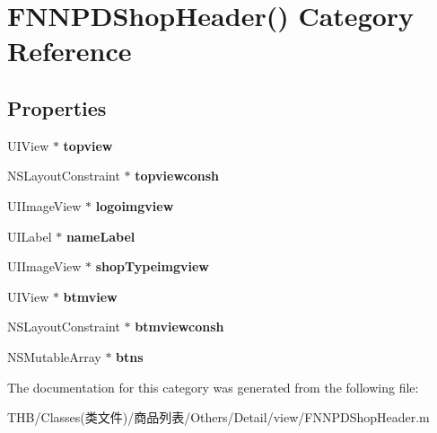 \hypertarget{category_f_n_n_p_d_shop_header_07_08}{}\section{F\+N\+N\+P\+D\+Shop\+Header() Category Reference}
\label{category_f_n_n_p_d_shop_header_07_08}
\subsection*{Properties}
\begin{DoxyCompactItemize}
\item 
\mbox{\label{category_f_n_n_p_d_shop_header_07_08_a752caf4b6d70cb1616aace0a5da905bd}} 
U\+I\+View $\ast$ {\bfseries topview}
\item 
\mbox{\label{category_f_n_n_p_d_shop_header_07_08_a7ffaeb5be220703f9b22c5acc340354d}} 
N\+S\+Layout\+Constraint $\ast$ {\bfseries topviewconsh}
\item 
\mbox{\label{category_f_n_n_p_d_shop_header_07_08_a24a16d4f90a1ecf97877e4b21d931642}} 
U\+I\+Image\+View $\ast$ {\bfseries logoimgview}
\item 
\mbox{\label{category_f_n_n_p_d_shop_header_07_08_a5e1b3aefdd9591f8e54dd68b76c4f071}} 
U\+I\+Label $\ast$ {\bfseries name\+Label}
\item 
\mbox{\label{category_f_n_n_p_d_shop_header_07_08_aa2ce2d204574013dd9fad1ae38c174b4}} 
U\+I\+Image\+View $\ast$ {\bfseries shop\+Typeimgview}
\item 
\mbox{\label{category_f_n_n_p_d_shop_header_07_08_a99e0af1fdf4e5b0e293416602f797378}} 
U\+I\+View $\ast$ {\bfseries btmview}
\item 
\mbox{\label{category_f_n_n_p_d_shop_header_07_08_adc1c49db1403ac9f2db802c4132ff76a}} 
N\+S\+Layout\+Constraint $\ast$ {\bfseries btmviewconsh}
\item 
\mbox{\label{category_f_n_n_p_d_shop_header_07_08_a3a0faa738555069e099b8d91e0c02f3d}} 
N\+S\+Mutable\+Array $\ast$ {\bfseries btns}
\end{DoxyCompactItemize}


The documentation for this category was generated from the following file\+:\begin{DoxyCompactItemize}
\item 
T\+H\+B/\+Classes(类文件)/商品列表/\+Others/\+Detail/view/F\+N\+N\+P\+D\+Shop\+Header.\+m\end{DoxyCompactItemize}
